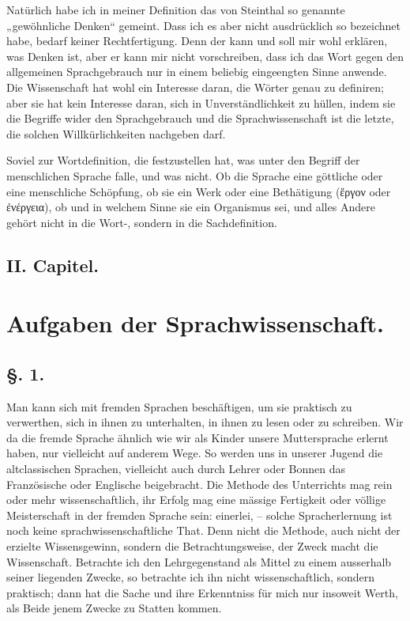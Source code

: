 Natürlich habe ich in meiner Definition das von Steinthal so genannte „gewöhnliche Denken“ gemeint. Dass ich es aber nicht ausdrücklich so bezeichnet habe, bedarf keiner Rechtfertigung. Denn der  kann und soll mir wohl erklären, was Denken ist, aber er kann mir nicht vorschreiben, dass ich das Wort gegen den allgemeinen Sprachgebrauch nur in einem beliebig eingeengten Sinne anwende. Die Wissenschaft hat wohl ein Interesse daran, die Wörter genau zu definiren; aber sie hat kein Interesse daran, sich in Unverständlichkeit zu hüllen, indem sie die Begriffe wider den Sprachgebrauch  und die Sprachwissenschaft ist die letzte, die solchen Willkürlichkeiten nachgeben darf.

\begin{sloppypar}Soviel zur Wortdefinition, die festzustellen hat, was unter den Begriff der menschlichen Sprache falle, und was nicht. Ob die Sprache eine göttliche oder eine menschliche Schöpfung, ob sie ein Werk oder eine Bethätigung (ἔργον oder ἐνέργεια), ob und in welchem Sinne sie ein Organismus sei, und alles Andere gehört nicht in die Wort-, sondern in die Sachdefinition.\end{sloppypar}

\subsection*{II. Capitel.}
\section*{Aufgaben der Sprachwissenschaft.}
\subsection*{§. 1.}\label{I.II.1}

Man kann sich mit fremden Sprachen beschäftigen, um sie praktisch zu verwerthen, sich in ihnen zu unterhalten, in ihnen zu lesen oder zu schreiben. Wir  da die fremde Sprache ähnlich wie wir als Kinder unsere Muttersprache erlernt haben, nur vielleicht auf anderem Wege. So werden uns in unserer Jugend die altclassischen Sprachen, vielleicht auch durch Lehrer oder Bonnen das Französische oder Englische beigebracht. Die Methode des Unterrichts mag rein  oder mehr wissenschaftlich, ihr Erfolg mag eine mässige Fertigkeit oder völlige Meisterschaft in der fremden Sprache sein: einerlei, – solche Spracherlernung ist noch keine sprachwissenschaftliche That. Denn nicht die Methode, auch nicht der erzielte Wissensgewinn, sondern die Betrachtungsweise, der Zweck macht die Wissenschaft. Betrachte ich den Lehrgegenstand als Mittel zu einem ausserhalb seiner liegenden Zwecke, so \label{fp.9} betrachte ich ihn nicht wissenschaftlich, sondern praktisch; dann hat die Sache und ihre Erkenntniss für mich nur insoweit Werth, als Beide jenem Zwecke zu Statten kommen.

